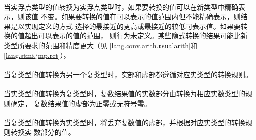 {
\paragraph{}
当实浮点类型的值转换为实浮点类型时，如果要转换的值可以在新类型中精确表示，则该值
不变。如果要转换的值在可以表示的值范围内但不能精确表示，则结果是以实现定义的方式
选择的最接近的更高或最接近的较低可表示值。如果要转换的值超出可以表示的值的范围，
则行为未定义。某些隐式转换的结果可能比新类型所要求的范围和精度更大（见
\ref{lang.conv.arith.usualarith}和\ref{lang.stmt.jmp.ret}）。

\paragraph{}
当复类型的值转换为另一个复类型时，实部和虚部都遵循对应实类型的转换规则。

\paragraph{}
当实类型的值转换为复类型时，复数结果值的实数部分由转换为相应实数类型的规则确定，
复数结果值的虚部为正零或无符号零。

\paragraph{}
当复类型的值转换为实类型时，将丢弃复数值的虚部，并根据对应实类型的转换规则转换实
数部分的值。

}
